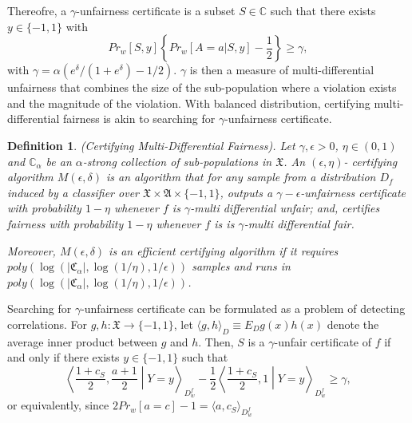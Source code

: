 \documentclass{article}
\newtheorem{defn}{Definition}[section]
\begin{document}
Thereofre, a $\gamma$-unfairness certificate is a subset $S\in \mathbb{C}$ such that there exists $y\in \{-1, 1\}$ with
\begin{equation}
    Pr_{w}[S, y]\left\{Pr_{w}[A=a |S, y] -\frac{1}{2}\right\}\geq \gamma,
\end{equation}
with $\gamma =\alpha \left(e^{\delta}/(1+e^{\delta})-1/2\right)$. $\gamma$ is then a measure of multi-differential unfairness that combines the size of the sub-population where a violation exists and the magnitude of the violation. With balanced distribution, certifying multi-differential fairness is akin to searching for $\gamma$-unfairness certificate. 

\begin{defn}(Certifying Multi-Differential Fairness). 
Let $\gamma, \epsilon >0$, $\eta\in (0, 1)$ and $\mathbb{C}_{\alpha}$ be an $\alpha$-strong collection of sub-populations in $\mathfrak{X}$. An $(\epsilon, \eta)$- certifying algorithm $M(\epsilon, \delta)$ is an algorithm that for any sample from a distribution $D_{f}$ induced by a classifier over $\mathfrak{X} \times \mathfrak{A}\times \{-1, 1\}$, outputs a $\gamma-\epsilon$-unfairness certificate with probability $1-\eta$ whenever $f$ is $ \gamma$-multi differential unfair; and, certifies fairness with probability $1-\eta$ whenever $f$ is is $\gamma$-multi differential fair. 

\bigskip
Moreover, $M(\epsilon, \delta)$ is an efficient certifying algorithm if it requires $poly(\log(|\mathfrak{C}_{\alpha}|, \log(1/\eta), 1/\epsilon))$ samples and runs in $poly(\log(|\mathfrak{C}_{\alpha}|, \log(1/\eta), 1/\epsilon))$. 
\end{defn}

Searching for $\gamma$-unfairness certificate can be formulated as a problem of detecting correlations. For $g, h:\mathfrak{X}\rightarrow \{-1, 1\}$,   let $\langle g, h\rangle_{D}\equiv E_{D}g(x)h(x)$ denote the average inner product between $g$ and $h$. Then, $S$ is a $\gamma$-unfair certificate of $f$ if and only if there exists $y\in \{-1, 1\}$ such that
\begin{equation}
    \left\langle \frac{1+c_{S}}{2}, \frac{a + 1}{2}\middle|Y=y\right\rangle_{D_{w}^{f}} -\frac{1}{2} \left\langle \frac{1+c_{S}}{2}, 1\middle |Y=y\right\rangle_{D_{w}^{f}} \geq \gamma,
\end{equation}
or equivalently, since $2Pr_{w}[a=c] - 1= \langle a, c_{S}\rangle_{D_{w}^{f}}$
\end{document}
